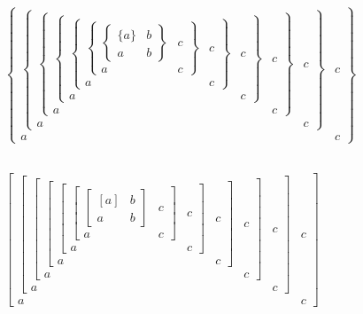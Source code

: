 \documentclass{article}
\begin{document}
\begin{flushleft}
\addtolength{\arraycolsep}{-.5\arraycolsep}
$
\left\{\begin{array}{cc}%
\left\{\begin{array}{cc}%
\left\{\begin{array}{cc}%
\left\{\begin{array}{cc}%
\left\{\begin{array}{cc}%
\left\{\begin{array}{cc}%
\left\{\begin{array}{cc}%
\{a\}&b\\a&b%
\end{array}\right\}&c\\a&c%
\end{array}\right\}&c\\a&c%
\end{array}\right\}&c\\a&c%
\end{array}\right\}&c\\a&c%
\end{array}\right\}&c\\a&c%
\end{array}\right\}&c\\a&c%
\end{array}\right\}
$

\\[2ex]

$
\left[\begin{array}{cc}%
\left[\begin{array}{cc}%
\left[\begin{array}{cc}%
\left[\begin{array}{cc}%
\left[\begin{array}{cc}%
\left[\begin{array}{cc}%
\left[\begin{array}{cc}%
[a]&b\\a&b%
\end{array}\right]&c\\a&c%
\end{array}\right]&c\\a&c%
\end{array}\right]&c\\a&c%
\end{array}\right]&c\\a&c%
\end{array}\right]&c\\a&c%
\end{array}\right]&c\\a&c%
\end{array}\right]
$
\\[2ex]


\end{flushleft}
\end{document}
